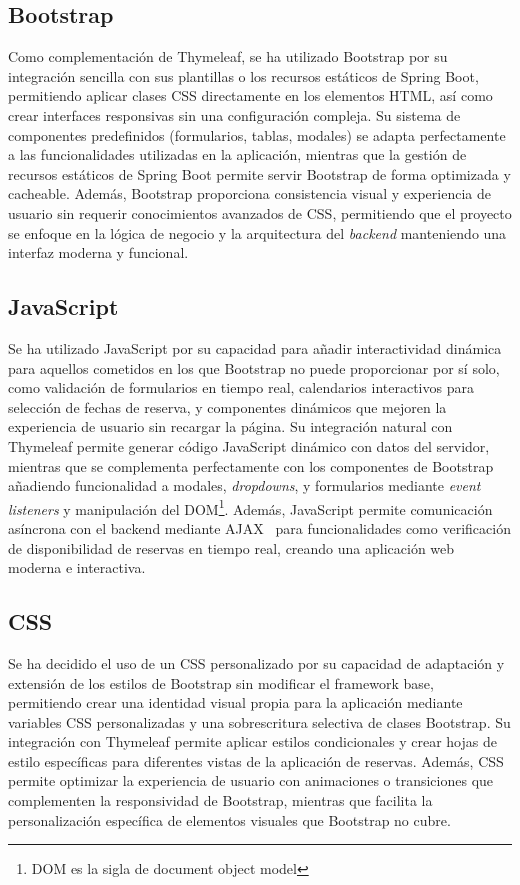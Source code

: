 \subsection{Bootstrap}\label{bootstrap}
Como complementación de Thymeleaf, se ha utilizado Bootstrap por su integración sencilla con sus plantillas o los recursos estáticos de Spring Boot, permitiendo aplicar clases CSS directamente en los elementos HTML, así como crear interfaces responsivas sin una configuración compleja. Su sistema de componentes predefinidos (formularios, tablas, modales) se adapta perfectamente a las funcionalidades utilizadas en la aplicación, mientras que la gestión de recursos estáticos de Spring Boot permite servir Bootstrap de forma optimizada y cacheable. Además, Bootstrap proporciona consistencia visual y experiencia de usuario sin requerir conocimientos avanzados de CSS, permitiendo que el proyecto se enfoque en la lógica de negocio y la arquitectura del \emph{backend} manteniendo una interfaz moderna y funcional.

\subsection{JavaScript}\label{javascript}
Se ha utilizado JavaScript por su capacidad para añadir interactividad dinámica para aquellos cometidos en los que Bootstrap no puede proporcionar por sí solo, como validación de formularios en tiempo real, calendarios interactivos para selección de fechas de reserva, y componentes dinámicos que mejoren la experiencia de usuario sin recargar la página. Su integración natural con Thymeleaf permite generar código JavaScript dinámico con datos del servidor, mientras que se complementa perfectamente con los componentes de Bootstrap añadiendo funcionalidad a modales, \emph{dropdowns}, y formularios mediante \emph{event listeners} y manipulación del DOM\footnote{DOM es la sigla de document object model}. Además, JavaScript permite comunicación asíncrona con el backend mediante AJAX~\cite{ajax} para funcionalidades como verificación de disponibilidad de reservas en tiempo real, creando una aplicación web moderna e interactiva.

\subsection{CSS}\label{css}
Se ha decidido el uso de un CSS personalizado por su capacidad de adaptación y extensión de los estilos de Bootstrap sin modificar el framework base, permitiendo crear una identidad visual propia para la aplicación mediante variables CSS personalizadas y una sobrescritura selectiva de clases Bootstrap. Su integración con Thymeleaf permite aplicar estilos condicionales y crear hojas de estilo específicas para diferentes vistas de la aplicación de reservas. Además, CSS permite optimizar la experiencia de usuario con animaciones o transiciones que complementen la responsividad de Bootstrap, mientras que facilita la personalización específica de elementos visuales que Bootstrap no cubre.

